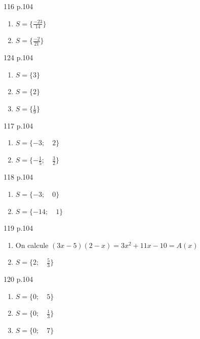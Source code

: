 \documentclass[10pt,a4paper,openany,twoside]{book}
\begin{document}
    \begin{bookexo}{116 p.104}
        \begin{enumerate}[label=\alph*.]
            \item 
            $S=\{\frac{-23}{14}\}$
            \item 
            $S=\{\frac{-2}{21}\}$
        \end{enumerate}
    \end{bookexo}
    \begin{bookexos}{124 p.104}
             \begin{enumerate}[label=\alph*.]
            \item 
            $S=\{3\}$
            \item 
            $S=\{2\}$
            \item 
            $S=\{\frac{1}{9}\}$
        \end{enumerate}
    \end{bookexos}
    \begin{bookexo}{117 p.104}
             \begin{enumerate}[label=\alph*.]
            \item 
            $S=\{-3;\quad 2\}$
            \item 
            $S=\{-\frac{1}{5};\quad \frac{3}{2}\}$
        \end{enumerate}
    \end{bookexo}
    \begin{bookexo}{118 p.104}
             \begin{enumerate}[label=\alph*.]
            \item 
            $S=\{-3;\quad 0\}$
            \item 
            $S=\{-14;\quad 1\}$
        \end{enumerate}
    \end{bookexo}
    \begin{bookexo}{119 p.104}
             \begin{enumerate}
            \item On calcule $(3x-5)(2-x)=3x^2+11x-10=A(x)$
            \item 
            $S=\{2;\quad \frac{5}{3}\}$
        \end{enumerate}
    \end{bookexo}
  \begin{bookexo}{120 p.104}
             \begin{enumerate}[label=\alph*.]
            \item 
            $S=\{0;\quad 5\}$
            \item 
            $S=\{0;\quad \frac{1}{3}\}$
            \item 
            $S=\{0;\quad 7\}$
        \end{enumerate}
    \end{bookexo}
\end{document}
